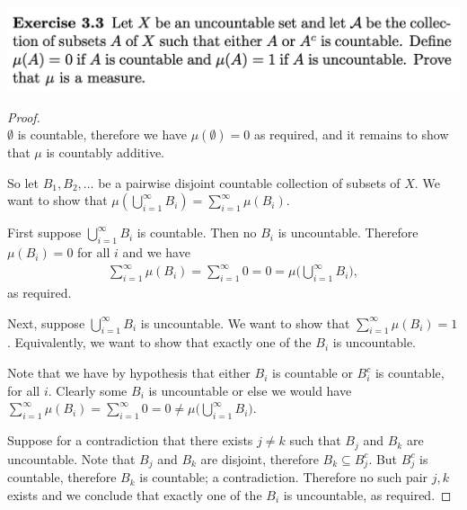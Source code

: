 \newpage
\begin{mdframed}
\includegraphics[width=400pt]{img/analysis--berkeley-202a-hw04-b168.png}
\end{mdframed}
\begin{proof}~\\
  $\emptyset$ is countable, therefore we have $\mu(\emptyset) = 0$ as required, and it remains to show
  that $\mu$ is countably additive.

  So let $B_1, B_2, \ldots$ be a pairwise disjoint countable collection of subsets of $X$. We want to show
  that $\mu(\bigcup_{i=1}^\infty B_i) = \sum_{i=1}^\infty \mu(B_i)$.


  First suppose $\bigcup_{i=1}^\infty B_i$ is countable. Then no $B_i$ is uncountable. Therefore $\mu(B_i) = 0$
  for all $i$ and we have
  \begin{align*}
    \sum_{i=1}^\infty \mu(B_i) = \sum_{i=1}^\infty 0 = 0 = \mu\big(\bigcup_{i=1}^\infty B_i\big),
  \end{align*}
  as required.

  Next, suppose $\bigcup_{i=1}^\infty B_i$ is uncountable. We want to show
  that $\sum_{i=1}^\infty \mu(B_i) = 1$. Equivalently, we want to show that exactly one of the $B_i$ is
  uncountable.

  Note that we have by hypothesis that either $B_i$ is countable or $B_i^c$ is countable, for all $i$. Clearly
  some $B_i$ is uncountable or else we would
  have $\sum_{i=1}^\infty \mu(B_i) = \sum_{i=1}^\infty 0 = 0 \neq \mu\big(\bigcup_{i=1}^\infty B_i\big)$.

  Suppose for a contradiction that there exists $j \neq k$ such that $B_j$ and $B_k$ are uncountable. Note
  that $B_j$ and $B_k$ are disjoint, therefore $B_k \subseteq B_j^c$. But $B_j^c$ is countable, therefore $B_k$
  is countable; a contradiction. Therefore no such pair $j, k$ exists and we conclude that exactly one of
  the $B_i$ is uncountable, as required.
\end{proof}

